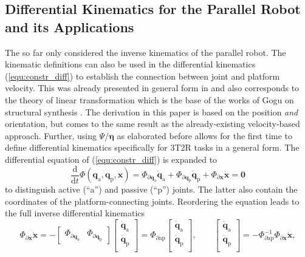 \documentclass[robotics,article,submit,moreauthors,pdftex]{Definitions/mdpi}
\newcommand{\bm}[1]{\boldsymbol{#1}}
\let\Phi\varPhi
\let\Psi\varPsi
\begin{document}
\subsection{Differential Kinematics for the Parallel Robot and its Applications}
\label{sec:ZB_Anwendung_PKM_DiffKin}

The  so far only considered the inverse kinematics of the parallel robot.
The kinematic definitions can also be used in the differential kinematics (\ref{equ:constr_diff}) to establish the connection between joint and platform velocity.
This was already presented in general form in \cite{Merlet2006} and also corresponds to the theory of linear transformation which is the base of the works of Gogu on structural synthesis \cite{Gogu2008}.
The derivation in this paper is based on the position \emph{and} orientation, but comes to the same result as the already-existing velocity-based approach.
Further, using $\bm{\Psi}$/$\bm{\eta}$ as elaborated before allows for the first time to define differential kinematics specifically for 3T2R tasks in a general form.
The differential equation of (\ref{equ:constr_diff}) is expanded to 
\begin{equation}
\frac{\mathrm{d}}{\mathrm{d}t} \bm{\Phi}(\bm{q}_{\mathrm{a}}, \bm{q}_{\mathrm{p}},\bm{x})
=
\bm{\Phi}_{\partial\bm{q}_{\mathrm{a}}} \dot{\bm{q}}_{\mathrm{a}} + \bm{\Phi}_{\partial\bm{q}_{\mathrm{p}}} \dot{\bm{q}}_{\mathrm{p}} + \bm{\Phi}_{\partial\bm{x}} \dot{\bm{x}} 
=
\bm{0}
\label{equ:constr_diff_qap}
\end{equation}
to distinguish active (``a'') and passive (``p'') joints.
The latter also contain the coordinates of the platform-connecting joints.
Reordering the equation leads to the full inverse differential kinematics
\begin{equation}
\bm{\Phi}_{\partial\bm{x}} \dot{\bm{x}}
=
- 
\begin{bmatrix} \bm{\Phi}_{\partial\bm{q}_{\mathrm{a}}} & \bm{\Phi}_{\partial\bm{q}_{\mathrm{p}}}\end{bmatrix}
\begin{bmatrix}
\dot{\bm{q}}_{\mathrm{a}} \\
\dot{\bm{q}}_{\mathrm{p}} \\
\end{bmatrix}
=
\bm{\Phi}_{\partial\mathrm{ap}}
\begin{bmatrix}
\dot{\bm{q}}_{\mathrm{a}} \\
\dot{\bm{q}}_{\mathrm{p}} \\
\end{bmatrix},
\quad\quad
\begin{bmatrix}
\dot{\bm{q}}_{\mathrm{a}} \\
\dot{\bm{q}}_{\mathrm{p}} \\
\end{bmatrix}
=
-\bm{\Phi}_{\partial\mathrm{ap}}^{-1} \bm{\Phi}_{\partial\bm{x}}
\dot{\bm{x}},
\label{equ:full_diff_ik}
\end{equation}
\end{document}
